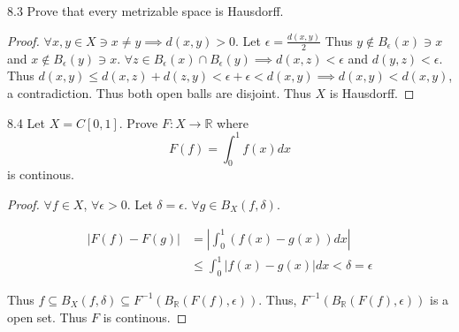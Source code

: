 \documentclass{article}
\newcommand*{\subeq}{\subseteq}
\newcommand{\R}{\mathbb{R}}
\newcommand{\abs}[1]{\left\lvert #1\right\rvert}
\begin{document}
\bigskip

\begin{claim}{8.3}\label{Claim 8.3.}
    Prove that every metrizable space is Hausdorff.
\end{claim}
\begin{proof}
    $\forall x, y \in X \ni x \neq y \implies d(x, y) > 0$. Let $\epsilon = \frac{d(x, y)}{2}$  Thus $y \not \in B_\epsilon(x) \ni x$ and $x \not \in B_\epsilon(y) \ni x$. $\forall z \in B_{\epsilon}(x) \cap B_{\epsilon}(y) \implies d(x,z) < \epsilon$ and $d(y, z) < \epsilon$. Thus $d(x, y) \leq d(x,z) + d(z, y) < \epsilon + \epsilon < d(x,y) \implies d(x, y) < d(x, y)$, a contradiction. Thus both open balls are disjoint. Thus $X$ is Hausdorff.         
\end{proof}

\bigskip

\begin{claim}{8.4}\label{Claim 8.4.}
    Let $X = C[0, 1]$. Prove $F: X \to \R$ where \[F(f) = \int_{0}^1 f(x) dx \] is continous.  
\end{claim}
\begin{proof}
    $\forall f \in X$, $\forall \epsilon > 0$. Let $\delta = \epsilon$. $\forall g \in B_{X}(f, \delta)$. 
    
    \begin{align*}
        \abs{F(f) - F(g)} &= \abs{\int_{0}^1 (f(x) - g(x)) dx} \\
        &\leq \int_{0}^1 \abs{f(x) - g(x)} dx < \delta = \epsilon
    \end{align*}

    Thus $f \subeq B_{X}(f, \delta) \subeq F^{-1}(B_{\R}(F(f), \epsilon))$. Thus, $F^{-1}(B_{\R}(F(f), \epsilon))$ is a open set. Thus $F$ is continous.   
\end{proof}

\bigskip
\end{document}
